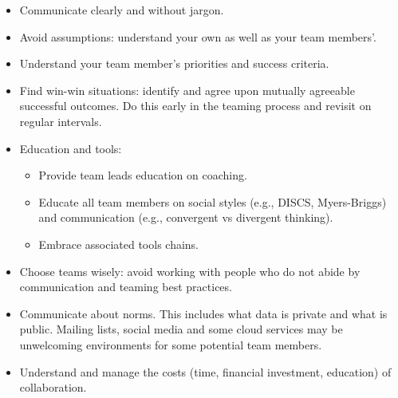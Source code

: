\begin{itemize}
\begin{itemize}
    \item Communicate clearly and without jargon.
\item  Avoid assumptions: understand your own as well as your team members’. 
\item Understand your team member’s priorities and success criteria.
\item Find win-win situations: identify and agree upon mutually agreeable successful outcomes.  Do this early in the teaming process and revisit on regular intervals.
\item Education and tools: 
\begin{itemize}
    \item Provide team leads education on coaching.  
\item Educate all team members on social styles (e.g., DISCS, Myers-Briggs) and communication (e.g., convergent vs divergent thinking).  
\item Embrace associated tools chains.
\end{itemize}
\item Choose teams wisely: avoid working with people who do not abide by communication and teaming best practices.
\item Communicate about norms.  This includes what data is private and what is public.  Mailing lists, social media and some cloud services may be unwelcoming environments for some potential team members.
\item Understand and manage the costs (time, financial investment, education) of collaboration.

\end{itemize}
\end{itemize}